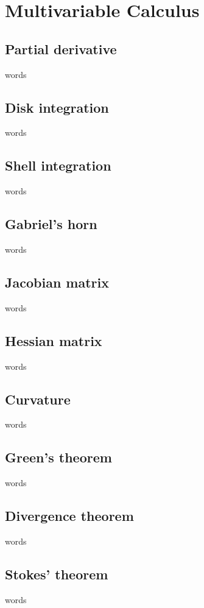 \chapter{Multivariable Calculus}


\section{Partial derivative}
words

\section{Disk integration}
words

\section{Shell integration}
words

\section{Gabriel's horn}
words

\section{Jacobian matrix}
words

\section{Hessian matrix}
words

\section{Curvature}
words

\section{Green's theorem}
words

\section{Divergence theorem}
words

\section{Stokes' theorem}
words


